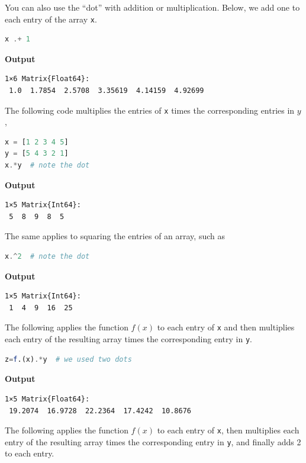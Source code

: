 You can also use the ``dot'' with addition or multiplication. Below, we add one to each entry of the array \texttt{x}. \\

\begin{lstlisting}[language=Julia,style=mystyle]
x .+ 1
\end{lstlisting}
\textbf{Output} 
\begin{verbatim}
1×6 Matrix{Float64}:
 1.0  1.7854  2.5708  3.35619  4.14159  4.92699
\end{verbatim}

The following code multiplies the entries of \texttt{x} times the corresponding entries in $y$,\\

\begin{lstlisting}[language=Julia,style=mystyle]
x = [1 2 3 4 5]
y = [5 4 3 2 1]
x.*y  # note the dot
\end{lstlisting}
\textbf{Output} 
\begin{verbatim}
1×5 Matrix{Int64}:
 5  8  9  8  5
\end{verbatim}

The same applies to squaring the entries of an array, such as \\

\begin{lstlisting}[language=Julia,style=mystyle]
x.^2  # note the dot
\end{lstlisting}
\textbf{Output} 
\begin{verbatim}
1×5 Matrix{Int64}:
 1  4  9  16  25
\end{verbatim}

The following applies the function $f(x)$ to each entry of \texttt{x} and then multiplies each entry of the resulting array times the corresponding entry in \texttt{y}.\\

\begin{lstlisting}[language=Julia,style=mystyle]
z=f.(x).*y  # we used two dots
\end{lstlisting}
\textbf{Output} 
\begin{verbatim}
1×5 Matrix{Float64}:
 19.2074  16.9728  22.2364  17.4242  10.8676
\end{verbatim}

The following applies the function $f(x)$ to each entry of \texttt{x}, then multiplies each entry of the resulting array times the corresponding entry in \texttt{y}, and finally adds 2 to each entry.\\

